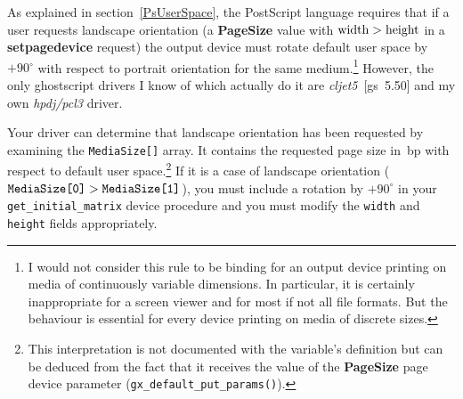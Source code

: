 \documentclass[twoside,a4paper]{article}
\newcommand{\ps}[1]{{\sffamily\bfseries #1}}	%
\newcommand{\prog}[1]{\texttt{#1}}
\begin{document}
As explained in section~\ref{PsUserSpace},
the PostScript language requires that
if a user requests landscape orientation
(a \ps{PageSize} value with $\hbox{width} > \hbox{height}$ in a
\ps{setpagedevice} request)
the output device must rotate default user space by $+90^\circ$ with respect
to portrait orientation for the same medium.\footnote{
  I would not consider this rule to be binding for an output device printing
  on media of continuously variable dimensions.
  In particular, it is certainly inappropriate for a screen viewer and for most
  if not all file formats.
  But the behaviour is essential for every device printing on
  media of discrete sizes.}
However, the only ghostscript drivers I know of which actually do it are
\textit{cljet5\/}~[gs~5.50] and my own \textit{hpdj/pcl3\/} driver.

Your driver can determine that landscape orientation has been requested by
examining the \prog{MediaSize[]} array.
It contains the requested page size in~bp with respect to default user
space.\footnote{
  This interpretation is not documented with the variable's definition
  but can be deduced from the fact that it receives the value of the
  \ps{PageSize} page device parameter (\prog{gx\_default\_put\_params()}).}
If it is a case of landscape orientation
($\hbox{\prog{MediaSize[0]}} > \hbox{\prog{MediaSize[1]}}$),
you must include a rotation by $+90^\circ$ in your \prog{get\_initial\_matrix}
device procedure and you must modify the \prog{width} and \prog{height}
fields appropriately.
\end{document}
